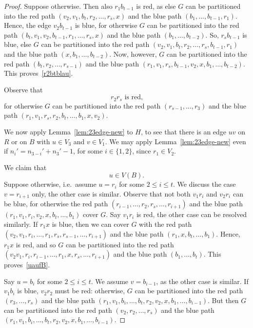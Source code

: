 \documentclass[a4paper,10pt]{article}
\begin{document}
\begin{proof}
Suppose otherwise.
Then also $r_1b_{t-1}$ is red, as else $G$ can be partitioned into the red path $(v_2,v_1,b_t,r_2,\ldots,r_s,x)$ and the blue path $(b_1,\ldots,b_{t-1},r_1)$.
Hence, the edge $v_2b_{t-1}$ is blue, for otherwise $G$ can be partitioned into the red path $(b_t,v_1,v_2,b_{t-1},r_1,\ldots,r_s,x)$ and the blue path $(b_1,\ldots,b_{t-2})$.
So, $r_sb_{t-1}$ is blue, else $G$ can be partitioned into the red path $(v_2,v_1,b_t,r_2,\ldots,r_s,b_{t-1},r_1)$ and the blue path $(x,b_1,\ldots,b_{t-2})$.
Now, however, $G$ can be partitioned into the red path $(b_t,r_2,\ldots,r_{s-1})$ and the blue path $(r_1,v_1,r_s,b_{t-1},v_2,x,b_1,\ldots,b_{t-2})$. This proves~\eqref{r2btblau}.

Observe that 
\begin{equation}\label{r2rsrot}
 \text{$r_2r_s$ is red,}
 \end{equation}
 for otherwise $G$ can be partitioned into the red path $(r_{s-1},\ldots,r_3)$ and the blue path $(r_1,v_1,r_s,r_2,b_t,\ldots,b_1,x,v_2)$. 

We now apply Lemma~\ref{lem:23edge-new} to $H$,
 to see that there is an edge $uv$ on $R$ or on $B$ with $u \in V_3$ and $v \in V_1$.
We may apply Lemma~\ref{lem:23edge-new} even if $n_i'=n_{3-i}'+n_3'-1$, for some $i \in \{1,2\}$, since $r_1 \in V_2$.

We claim that
\begin{equation}\label{uaufB}
 \text{$u \in V(B)$.}
 \end{equation}
Suppose otherwise, i.e.~assume $u = r_i$ for some $2 \le i \le t$.
We discuss the case $v = r_{i+1}$ only, the other case is similar.
Observe that not both $v_1r_i$ and $v_2r_i$ can be blue, for otherwise  the red path $(r_{i-1},\ldots,r_2,r_s,\ldots,r_{i+1})$ and the blue path $(r_1,v_1,r_i,v_2,x,b_t,\ldots,b_1)$ cover $G$.
Say $v_1r_i$ is red,  the other case can be resolved similarly.
If $r_1x$ is blue, then we can cover $G$ with the red path $(v_2,v_1,r_i,\ldots,r_1,r_s,r_{s-1},\ldots, r_{i+1})$ and the blue path $(r_1,x,b_t,\ldots,b_1)$.
Hence, $r_1x$ is red, and so $G$ can be partitioned into the red path $(v_2v_1,r_i,r_{i-1},\ldots,r_1,x,r_s,\ldots,r_{i+1})$ and the blue path $(b_1,\ldots,b_t)$.
This proves~\eqref{uaufB}.

Say $u = b_i$ for some $2 \le i \le t$.
We assume $v = b_{i-1}$, as the other case is similar.
If $v_1b_i$ is blue, $v_2r_2$ must be red: otherwise, $G$ can be partitioned into the red path $(r_3,\ldots,r_s)$ and the blue path $(r_1,v_1,b_i,\ldots,b_t,r_2,v_2,x,b_1,\ldots,b_{i-1})$.
But then $G$ can be partitioned into the red path $(v_2,r_2,\ldots,r_s)$ and the blue path $(r_1,v_1,b_i,\ldots,b_t,r_2,v_2,x,b_1,\ldots,b_{i-1})$.


\end{proof}
\end{document}
